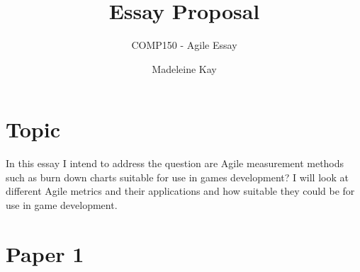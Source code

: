 \documentclass{scrartcl}
\title{Essay Proposal}
\subtitle{COMP150 - Agile Essay}
\author{Madeleine Kay}
\begin{document}
\maketitle

\section*{Topic}
In this essay I intend to address the question are Agile measurement methods such as burn down charts suitable for use in games development? I will look at different Agile metrics and their applications and how suitable they could be for use in game development.

\section*{Paper 1}
\end{document}
